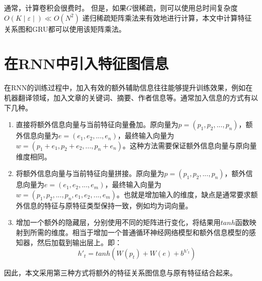 通常，计算卷积会很费时。 但是，如果$G$很稀疏，则可以使用总时间复杂度 $O(K \mid \varepsilon \mid) \ll O(N^ 2)$ 递归稀疏矩阵乘法来有效地进行计算，本文中计算特征关系图和GRU都可以使用该矩阵乘法。



\section{在RNN中引入特征图信息}
在RNN的训练过程中，加入有效的额外辅助信息往往能够提升训练效果，例如在机器翻译领域，加入文章的关键词、摘要、作者信息等。通常加入信息的方式有以下几种。

\begin{enumerate}
  \item 直接将额外信息向量与当前特征向量叠加。原向量为$p=(p_1,p_2,...,p_n)$，额外信息向量为$e=(e_1,e_2,...,e_n)$，最终输入向量为$w=(p_1+e_1,p_2+e_2,...,p_n+e_n)$。这种方法需要保证额外信息向量与原向量维度相同。
  \item 将额外信息向量与当前特征向量拼接。原向量为$p=(p_1,p_2,...,p_n)$，额外信息向量为$e=(e_1,e_2,...,e_m)$，最终输入向量为$w=(p_1,p_2,...,p_n,e_1,e_2,...,e_m)$。也就是增加输入的维度，缺点是通常要求额外信息的特征与原特征类型保持一致，例如均为词向量。
  \item 增加一个额外的隐藏层，分别使用不同的矩阵进行变化，将结果用$tanh$函数映射到所需的维度。相当于增加一个普通循环神经网络模型和额外信息模型的感知器，然后加载到输出层上。即：
  \begin{equation}
    h'_t= tanh(W(p_t) + W(e) + b^{h'_t})
  \end{equation}
\end{enumerate}
因此，本文采用第三种方式将额外的特征关系图信息与原有特征结合起来。

